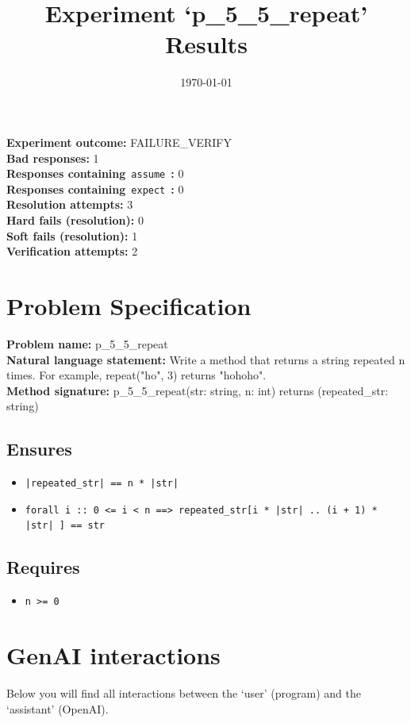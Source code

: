 \documentclass{article}
\begin{document}
\title{Experiment `p\_5\_5\_repeat' Results}
\author{\today}
\date{}
\maketitle
\textbf{Experiment outcome: }FAILURE\_VERIFY
\\\textbf{Bad responses: }1
\\\textbf{Responses containing}~\texttt{assume}~\textbf{: }0
\\\textbf{Responses containing}~\texttt{expect}~\textbf{: }0
\\\textbf{Resolution attempts: }3
\\\textbf{Hard fails (resolution): }0
\\\textbf{Soft fails (resolution): }1
\\\textbf{Verification attempts: }2
\section*{Problem Specification}
\textbf{Problem name: }p\_5\_5\_repeat
\\\textbf{Natural language statement: }Write a method that returns a string repeated n times. For example, repeat("ho", 3) returns "hohoho".
\\\textbf{Method signature: }p\_5\_5\_repeat(str: string, n: int) returns (repeated\_str: string)
\subsection*{Ensures}
\begin{itemize}
\item \texttt{|repeated\_str| == n * |str|}
\item \texttt{forall i :: 0 <= i < n ==> repeated\_str[i * |str| .. (i + 1) * |str| ] == str}
\end{itemize}
\subsection*{Requires}
\begin{itemize}
\item \texttt{n >= 0}
\end{itemize}
\clearpage
\section*{GenAI interactions}
Below you will find all interactions between the `user' (program) and the `assistant' (OpenAI).
\end{document}
